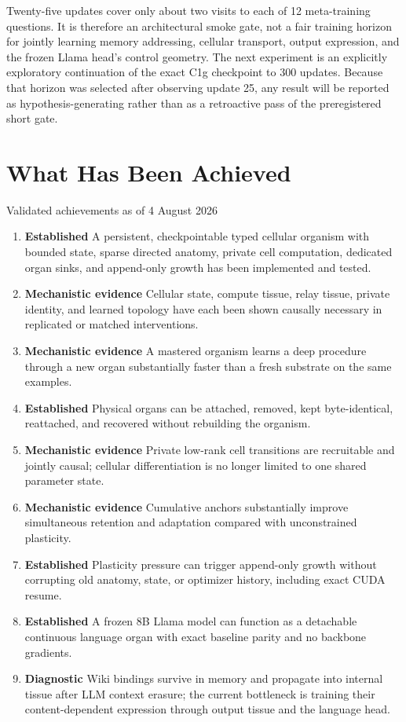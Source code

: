 \documentclass[11pt]{article}
\newcommand{\established}{\textcolor{DmonGreen}{\textbf{Established}}}
\newcommand{\mechanistic}{\textcolor{DmonBlue}{\textbf{Mechanistic evidence}}}
\newcommand{\diagnostic}{\textcolor{DmonGold}{\textbf{Diagnostic}}}
\begin{document}
Twenty-five updates cover only about two visits to each of 12 meta-training questions.
It is therefore an architectural smoke gate, not a fair training horizon for jointly
learning memory addressing, cellular transport, output expression, and the frozen Llama
head's control geometry. The next experiment is an explicitly exploratory continuation
of the exact C1g checkpoint to 300 updates. Because that horizon was selected after
observing update 25, any result will be reported as hypothesis-generating rather than as
a retroactive pass of the preregistered short gate.

\section{What Has Been Achieved}

\begin{claimbox}{Validated achievements as of 4 August 2026}
\begin{enumerate}
  \item \established{} A persistent, checkpointable typed cellular organism with
        bounded state, sparse directed anatomy, private cell computation, dedicated
        organ sinks, and append-only growth has been implemented and tested.
  \item \mechanistic{} Cellular state, compute tissue, relay tissue, private identity,
        and learned topology have each been shown causally necessary in replicated or
        matched interventions.
  \item \mechanistic{} A mastered organism learns a deep procedure through a new organ
        substantially faster than a fresh substrate on the same examples.
  \item \established{} Physical organs can be attached, removed, kept byte-identical,
        reattached, and recovered without rebuilding the organism.
  \item \mechanistic{} Private low-rank cell transitions are recruitable and jointly
        causal; cellular differentiation is no longer limited to one shared parameter
        state.
  \item \mechanistic{} Cumulative anchors substantially improve simultaneous retention
        and adaptation compared with unconstrained plasticity.
  \item \established{} Plasticity pressure can trigger append-only growth without
        corrupting old anatomy, state, or optimizer history, including exact CUDA resume.
  \item \established{} A frozen 8B Llama model can function as a detachable continuous
        language organ with exact baseline parity and no backbone gradients.
  \item \diagnostic{} Wiki bindings survive in memory and propagate into internal
        tissue after LLM context erasure; the current bottleneck is training their
        content-dependent expression through output tissue and the language head.
\end{enumerate}
\end{claimbox}
\end{document}
